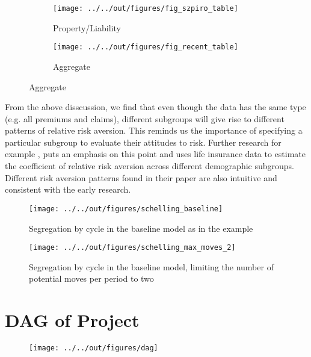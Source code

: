 \documentclass[11pt, a4paper, leqno]{article}
\begin{document}
\begin{figure}[H]
\centering
{}
\caption{Comparison between Property/Liability Insurance Data and Aggregate Insurance Data}

\begin{subfigure}{0.5\textwidth}
    \centering
    \texttt{[image: ../../out/figures/fig\_szpiro\_table]}
    \caption{Property/Liability}
\end{subfigure}
\begin{subfigure}{0.5\textwidth}
    \centering
    \texttt{[image: ../../out/figures/fig\_recent\_table]}
    \caption{Aggregate}
\end{subfigure}

\end{figure}\label{comparision}

From the above disscussion, we find that even though the data has the same type (e.g. all premiums and claims),  different subgroups will give rise to different patterns of relative risk aversion. This reminds us the importance of specifying a particular subgroup to evaluate their attitudes to risk. Further research for example \citet{halek2001demography}, puts an emphasis on this point and uses life insurance data to estimate the coefficient of relative risk aversion across different demographic subgroups. Different risk aversion patterns found in their paper are also intuitive and consistent with the early research.

\begin{figure}
    \caption{Segregation by cycle in the baseline \citet{Schelling69} model as in the \citet{StachurskiSargent13} example}
    
    \texttt{[image: ../../out/figures/schelling\_baseline]}

\end{figure}


\begin{figure}
    \caption{Segregation by cycle in the baseline \citet{Schelling69} model, limiting the number of potential moves per period to two}
    
    \texttt{[image: ../../out/figures/schelling\_max\_moves\_2]}

\end{figure}





\printbibliography
{}

\newpage
\appendix
\section{DAG of Project}\label{app A}
\begin{figure}[H]
\texttt{[image: ../../out/figures/dag]}
\end{figure}



\end{document}
